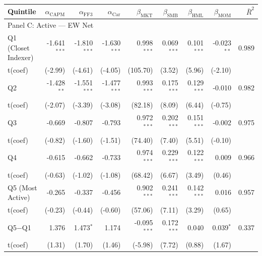 \begin{table}[!htbp]
{\begin{tabular*}{\linewidth}{@{\extracolsep{\fill}}lrrrrrrrr}
\toprule
Quintile & $\alpha_{\text{CAPM}}$ & $\alpha_{\text{FF3}}$ & $\alpha_{\text{Car}}$ & $\beta_{\text{MKT}}$ & $\beta_{\text{SMB}}$ & $\beta_{\text{HML}}$ & $\beta_{\text{MOM}}$ & $\bar{R}^2$\\
\midrule
\multicolumn{9}{l}{Panel C: Active --- EW Net}\\
\hspace{1em}Q1 (Closet Indexer) & -1.641$^{***}$ & -1.810$^{***}$ & -1.630$^{***}$ & 0.998$^{***}$ & 0.069$^{***}$ & 0.101$^{***}$ & -0.023$^{**}$ & 0.989\\
\hspace{1em}t(coef) & (-2.99) & (-4.61) & (-4.05) & (105.70) & (3.52) & (5.96) & (-2.10) & \\
\hspace{1em}Q2 & -1.428$^{**}$ & -1.551$^{***}$ & -1.477$^{***}$ & 0.993$^{***}$ & 0.175$^{***}$ & 0.129$^{***}$ & -0.010 & 0.982\\
\hspace{1em}t(coef) & (-2.07) & (-3.39) & (-3.08) & (82.18) & (8.09) & (6.44) & (-0.75) & \\
\hspace{1em}Q3 & -0.669 & -0.807 & -0.793 & 0.972$^{***}$ & 0.202$^{***}$ & 0.151$^{***}$ & -0.002 & 0.975\\
\hspace{1em}t(coef) & (-0.82) & (-1.60) & (-1.51) & (74.40) & (7.40) & (5.51) & (-0.10) & \\
\hspace{1em}Q4 & -0.615 & -0.662 & -0.733 & 0.974$^{***}$ & 0.229$^{***}$ & 0.122$^{***}$ & 0.009 & 0.966\\
\hspace{1em}t(coef) & (-0.63) & (-1.02) & (-1.08) & (68.42) & (6.67) & (3.49) & (0.46) & \\
\hspace{1em}Q5 (Most Active) & -0.265 & -0.337 & -0.456 & 0.902$^{***}$ & 0.241$^{***}$ & 0.142$^{***}$ & 0.016 & 0.957\\
\hspace{1em}t(coef) & (-0.23) & (-0.44) & (-0.60) & (57.06) & (7.11) & (3.29) & (0.65) & \\
\hspace{1em}Q5$-$Q1 & 1.376 & 1.473$^{*}$ & 1.174 & -0.095$^{***}$ & 0.172$^{***}$ & 0.040 & 0.039$^{*}$ & 0.337\\
\hspace{1em}t(coef) & (1.31) & (1.70) & (1.46) & (-5.98) & (7.72) & (0.88) & (1.67) & \\

\end{tabular*}}
\end{table}
